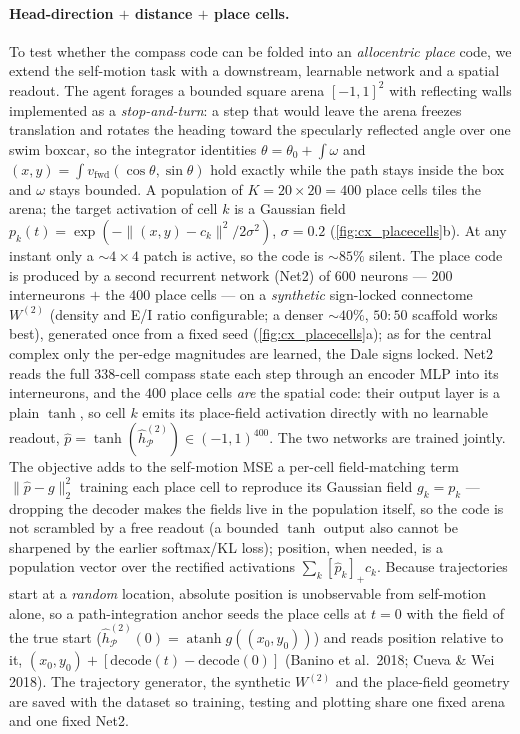\documentclass[11pt]{article}
\begin{document}
\paragraph{Head-direction $+$ distance $+$ place cells.}\label{method:placecells}
To test whether the compass code can be folded into an \emph{allocentric place}
code, we extend the self-motion task with a downstream, learnable network and a
spatial readout. The agent forages a bounded square arena $[-1,1]^2$ with
reflecting walls implemented as a \emph{stop-and-turn}: a step that would leave
the arena freezes translation and rotates the heading toward the specularly
reflected angle over one swim boxcar, so the integrator identities
$\theta=\theta_0+\!\int\!\omega$ and
$(x,y)=\!\int v_{\mathrm{fwd}}(\cos\theta,\sin\theta)$ hold exactly while the
path stays inside the box and $\omega$ stays bounded. A population of
$K=20\times20=400$ place cells tiles the arena; the target activation of cell
$k$ is a Gaussian field $p_k(t)=\exp(-\lVert(x,y)-c_k\rVert^2/2\sigma^2)$,
$\sigma=0.2$ (\cref{fig:cx_placecells}b). At any instant only a $\sim\!4\times4$
patch is active, so the code is $\sim\!85\%$ silent. The place code is produced
by a second recurrent network (Net2) of $600$ neurons --- $200$ interneurons
$+$ the $400$ place cells --- on a \emph{synthetic} sign-locked connectome
$W^{(2)}$ (density and E/I ratio configurable; a denser $\sim\!40\%$, $50{:}50$
scaffold works best), generated once from a fixed seed
(\cref{fig:cx_placecells}a); as for the central complex only the per-edge
magnitudes are learned, the Dale signs locked. Net2 reads the full $338$-cell
compass state each step through an encoder MLP into its interneurons, and the
$400$ place cells \emph{are} the spatial code: their output layer is a plain
$\tanh$, so cell $k$ emits its place-field activation directly with no learnable
readout, $\hat p=\tanh(\hat h^{(2)}_{\mathcal P})\in(-1,1)^{400}$. The two
networks are trained jointly. The objective adds to the self-motion MSE a
per-cell field-matching term $\lVert\hat p-g\rVert_2^2$ training each place cell
to reproduce its Gaussian field $g_k=p_k$ --- dropping the decoder makes the
fields live in the population itself, so the code is not scrambled by a free
readout (a bounded $\tanh$ output also cannot be sharpened by the earlier
softmax/KL loss); position, when needed, is a population vector over the
rectified activations $\sum_k[\hat p_k]_+c_k$. Because trajectories start at a
\emph{random} location, absolute position is unobservable from self-motion
alone, so a path-integration anchor seeds the place cells at $t=0$ with the field
of the true start
($\hat h^{(2)}_{\mathcal P}(0)=\operatorname{atanh}g((x_0,y_0))$) and reads
position relative to it,
$(x_0,y_0)+[\mathrm{decode}(t)-\mathrm{decode}(0)]$ (Banino et al.\ 2018;
Cueva \& Wei 2018). The trajectory generator, the synthetic $W^{(2)}$ and the
place-field geometry are saved with the dataset so training, testing and
plotting share one fixed arena and one fixed Net2.
\end{document}
